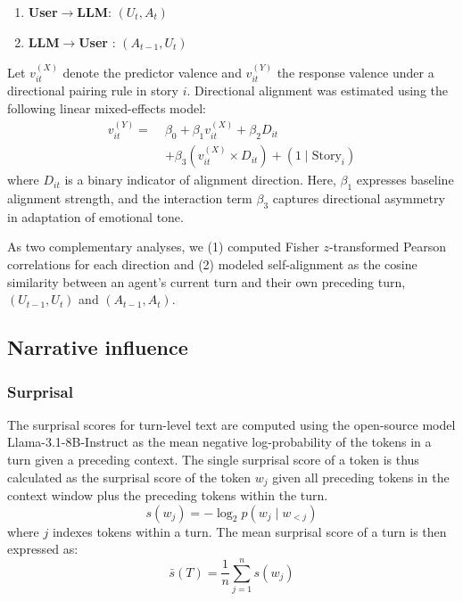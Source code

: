 \documentclass[11pt]{article}
\begin{document}
\begin{enumerate}
    \item \textbf{User$\rightarrow$LLM}: $(U_t, A_t)$
    \item \textbf{LLM$\rightarrow$User }: $(A_{t-1}, U_t)$
\end{enumerate}


Let $v^{(X)}_{it}$ denote the predictor valence and $v^{(Y)}_{it}$ the response valence under a directional pairing rule in story $i$. Directional alignment was estimated using the following linear mixed-effects model:
\begin{equation}
\begin{aligned}
v^{(Y)}_{it} =\;& \beta_0 + \beta_1 v^{(X)}_{it} + \beta_2 D_{it} \\
&+ \beta_3 \left( v^{(X)}_{it} \times D_{it} \right) + (1 \mid \mathrm{Story}_i)
\end{aligned}
\end{equation}
where $D_{it}$ is a binary indicator of alignment direction. Here, $\beta_1$ expresses baseline alignment strength, and the interaction term $\beta_3$ captures directional asymmetry in adaptation of emotional tone.

As two complementary analyses, we (1) computed Fisher $z$-transformed Pearson correlations for each direction and (2) modeled self-alignment as the cosine similarity between an agent's current turn and their own preceding turn, $(U_{t-1}, U_t)$ and $(A_{t-1}, A_t)$.

\subsection{Narrative influence}
\subsubsection{Surprisal}
The surprisal scores for turn-level text are computed using the open-source model Llama-3.1-8B-Instruct as the mean negative log-probability of the tokens in a turn given a preceding context. The single surprisal score of a token is thus calculated as the surprisal score of the token $w_j$ given all preceding tokens in the context window plus the preceding tokens within the turn. 
 \begin{equation}
s(w_j) = -\log_2 p(w_j \mid w_{<j})
\end{equation}
where $j$ indexes tokens within a turn. The mean surprisal score of a turn is then expressed as:
\begin{equation}
\bar{s}(T) = \frac{1}{n} \sum_{j=1}^{n} s(w_j)
\end{equation}
\end{document}
